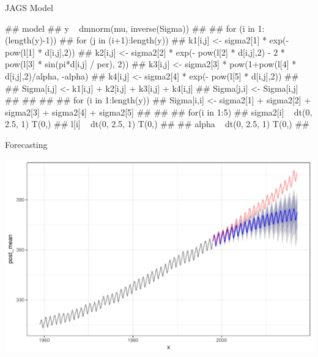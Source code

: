 \documentclass[11pt,ignorenonframetext,]{beamer}
\let\oldShaded\Shaded
\let\endoldShaded\endShaded
\let\oldverbatim\verbatim
\let\endoldverbatim\endverbatim
\renewenvironment{verbatim}{\footnotesize\begin{spacing}{0.9}\oldverbatim}{\endoldverbatim\end{spacing}}
\newcommand{\scriptoutput}{
  \renewenvironment{Shaded}{\scriptsize\begin{spacing}{0.9}\oldShaded}{\endoldShaded\end{spacing}}
  \renewenvironment{verbatim}{\scriptsize\begin{spacing}{0.9}\oldverbatim}{\endoldverbatim\end{spacing}}
}
\begin{document}
\begin{frame}[fragile]{JAGS Model}

\scriptoutput

\begin{verbatim}
## model{
##   y ~ dmnorm(mu, inverse(Sigma))
## 
##   for (i in 1:(length(y)-1)) {
##     for (j in (i+1):length(y)) {
##       k1[i,j] <- sigma2[1] * exp(- pow(l[1] * d[i,j],2))
##       k2[i,j] <- sigma2[2] * exp(- pow(l[2] * d[i,j],2) - 2 * pow(l[3] * sin(pi*d[i,j] / per), 2))
##       k3[i,j] <- sigma2[3] * pow(1+pow(l[4] * d[i,j],2)/alpha, -alpha)
##       k4[i,j] <- sigma2[4] * exp(- pow(l[5] * d[i,j],2))
##       
##       Sigma[i,j] <- k1[i,j] + k2[i,j] + k3[i,j] + k4[i,j]
##       Sigma[j,i] <- Sigma[i,j]
##     }
##   }
## 
##   for (i in 1:length(y)) {
##     Sigma[i,i] <- sigma2[1] + sigma2[2] + sigma2[3] + sigma2[4] + sigma2[5]
##   }  
## 
##   for(i in 1:5){
##     sigma2[i] ~ dt(0, 2.5, 1) T(0,)
##     l[i] ~ dt(0, 2.5, 1) T(0,)
##   }
##   alpha ~ dt(0, 2.5, 1) T(0,)
## }
\end{verbatim}

\end{frame}

\begin{frame}{Forecasting}

\includegraphics{Lec15_files/figure-beamer/unnamed-chunk-16-1.pdf}

\end{frame}
\end{document}
